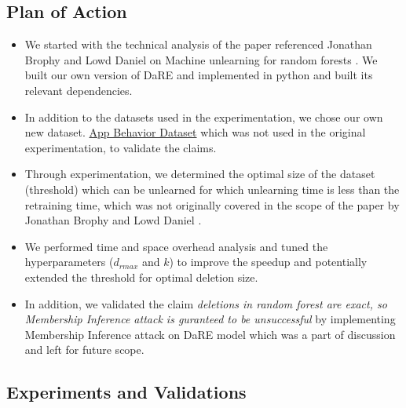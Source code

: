 \documentclass[11pt,letterpaper]{article}
\begin{document}
\subsection{Plan of Action}
\begin{itemize}
    \item We started with the technical analysis of the paper referenced Jonathan Brophy and Lowd Daniel on Machine unlearning for random forests \cite{Brophy}. We built our own version of DaRE and implemented in python and built its relevant dependencies.
    \item In addition to the datasets used in the experimentation,
    we chose our own new dataset. \href{https://www.kaggle.com/hkhamnakhalid/customers-to-subscription-through-app-behavior}{App Behavior Dataset} which was not used in the original experimentation, to validate the claims. 
    \item Through experimentation, we determined the optimal size of the dataset (threshold) which can be unlearned for which unlearning time is less than the retraining time, which was not originally covered in the scope of the paper by Jonathan Brophy and Lowd Daniel \cite{Brophy}.
    \item We performed time and space overhead analysis and tuned the hyperparameters ($d_{rmax}$ and $k$) to improve the speedup and potentially extended the threshold for optimal deletion size.
    \item  In addition, we validated the claim \textit{deletions in random forest are exact, so Membership Inference attack is guranteed to be unsuccessful} by implementing Membership Inference attack on DaRE model which was a part of discussion and left for future scope.
\end{itemize}


\subsection{Experiments and Validations}
\end{document}
